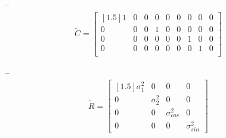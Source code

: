 \documentclass[fleqn,12pt]{article}
\begin{document}
\begin{itemize}
    \item[--]
        \begin{align*}
            \tilde{C}=\begin{bmatrix}[1.5]
                1 & 0 & 0 & 0 & 0 & 0 & 0 & 0 & 0\\
                0 & 0 & 0 & 1 & 0 & 0 & 0 & 0 & 0\\
                0 & 0 & 0 & 0 & 0 & 0 & 1 & 0 & 0\\
                0 & 0 & 0 & 0 & 0 & 0 & 0 & 1 & 0\\
            \end{bmatrix}
        \end{align*}

    \item[--]
        \begin{align}
            \tilde{R}=\begin{bmatrix}[1.5]
                \sigma^2_1 & 0 & 0 & 0\\
                0 & \sigma^2_2 & 0 & 0\\
                0 & 0 & \sigma^2_{cos} & 0\\
                0 & 0 & 0 & \sigma^2_{sin}
            \end{bmatrix}
        \end{align}
\end{itemize}



\end{document}
